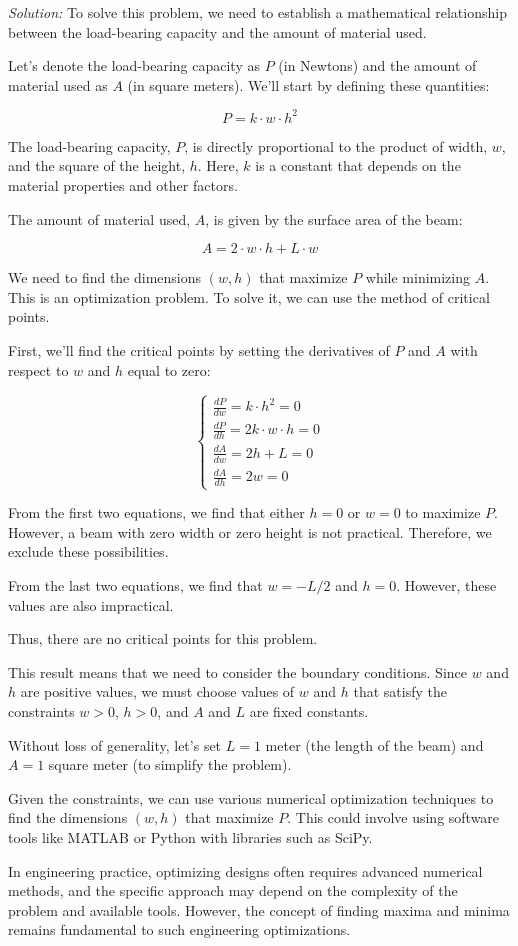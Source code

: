 \documentclass[a4paper,12pt]{book}
\newcounter{problem}
\newenvironment{solution}[1][]
{\par\noindent\textit{Solution:} \rmfamily}{\medskip}
\begin{document}
\begin{solution}
To solve this problem, we need to establish a mathematical relationship between the load-bearing capacity and the amount of material used. 

Let's denote the load-bearing capacity as $P$ (in Newtons) and the amount of material used as $A$ (in square meters). We'll start by defining these quantities:

\[
P = k \cdot w \cdot h^2
\]

The load-bearing capacity, $P$, is directly proportional to the product of width, $w$, and the square of the height, $h$. Here, $k$ is a constant that depends on the material properties and other factors.

The amount of material used, $A$, is given by the surface area of the beam:

\[
A = 2 \cdot w \cdot h + L \cdot w
\]

We need to find the dimensions $(w, h)$ that maximize $P$ while minimizing $A$. This is an optimization problem. To solve it, we can use the method of critical points.

First, we'll find the critical points by setting the derivatives of $P$ and $A$ with respect to $w$ and $h$ equal to zero:

\[
\begin{cases}
\frac{dP}{dw} = k \cdot h^2 = 0 \\
\frac{dP}{dh} = 2k \cdot w \cdot h = 0 \\
\frac{dA}{dw} = 2h + L = 0 \\
\frac{dA}{dh} = 2w = 0
\end{cases}
\]

From the first two equations, we find that either $h = 0$ or $w = 0$ to maximize $P$. However, a beam with zero width or zero height is not practical. Therefore, we exclude these possibilities.

From the last two equations, we find that $w = -L/2$ and $h = 0$. However, these values are also impractical.

Thus, there are no critical points for this problem.

This result means that we need to consider the boundary conditions. Since $w$ and $h$ are positive values, we must choose values of $w$ and $h$ that satisfy the constraints $w > 0$, $h > 0$, and $A$ and $L$ are fixed constants.

Without loss of generality, let's set $L = 1$ meter (the length of the beam) and $A = 1$ square meter (to simplify the problem).

Given the constraints, we can use various numerical optimization techniques to find the dimensions $(w, h)$ that maximize $P$. This could involve using software tools like MATLAB or Python with libraries such as SciPy.

In engineering practice, optimizing designs often requires advanced numerical methods, and the specific approach may depend on the complexity of the problem and available tools. However, the concept of finding maxima and minima remains fundamental to such engineering optimizations.
\end{solution}
\end{document}
